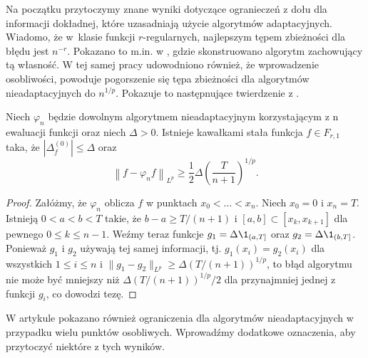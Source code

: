 \documentclass[oik, pdftex, man]{mgrwms}
\begin{document}
    Na początku przytoczymy znane wyniki dotyczące ogranieczeń z dołu dla informacji dokładnej, które uzasadniają użycie algorytmów adaptacyjnych. Wiadomo, że w~klasie funkcji $r$-regularnych, najlepszym tępem zbieżności dla błędu jest $n^{-r}$. Pokazano to m.in. w \cite{PoA}, gdzie skonstruowano algorytm zachowujący tą własność. W tej samej pracy udowodniono również, że wprowadzenie osobliwości, powoduje pogorszenie się tępa zbieżności dla algorytmów nieadaptacyjnych do $n^{1/p}$. Pokazuje to następnujące twierdzenie z \cite{PoA}.

    \begin{thm}
        Niech $\varphi_{n}$ będzie dowolnym algorytmem nieadaptacyjnym korzystającym z n ewaluacji funkcji oraz niech $\Delta > 0$. Istnieje kawałkami stała funkcja $f \in F_{r, 1}$ taka, że $|\Delta_{f}^{(0)}| \leq \Delta$ oraz
        \begin{equation*}
            \left\| f - \varphi_{n}f \right\|_{L^{p}} \geq \frac{1}{2}\Delta \left( \frac{T}{n+1} \right)^{1/p}.
        \end{equation*}
    \end{thm}
    \begin{proof}
        Załóżmy, że $\varphi_{n}$ oblicza $f$ w punktach $x_{0} < \ldots < x_{n}$. Niech $x_{0} = 0$ i $x_{n} = T$. Istnieją $0 < a < b < T$ takie, że $b-a \geq T/(n+1)$ i $[a,b] \subset [x_{k}, x_{k+1}]$ dla pewnego $0 \leq k \leq n-1$. Weźmy teraz funkcje $g_{1} = \Delta\1_{(a, T]}$ oraz $g_{2} = \Delta\1_{(b, T]}$. Ponieważ $g_{1}$ i $g_{2}$ używają tej samej informacji, tj. $g_{1}(x_{i}) = g_{2}(x_{i})$ dla wszystkich $1 \leq i \leq n$ i $\| g_{1} - g_{2} \|_{L^{p}} \geq \Delta(T / (n+1))^{1/p}$, to błąd algorytmu nie może być mniejszy niż $\Delta(T/(n+1))^{1/p} / 2$ dla przynajmniej jednej z funkcji $g_{i}$, co dowodzi tezę.
    \end{proof}

    W artykule \cite{PoA} pokazano również ograniczenia dla algorytmów nieadaptacyjnych w przypadku wielu punktów osobliwych. Wprowadźmy dodatkowe oznaczenia, aby przytoczyć niektóre z tych wyników.
    
\end{document}
